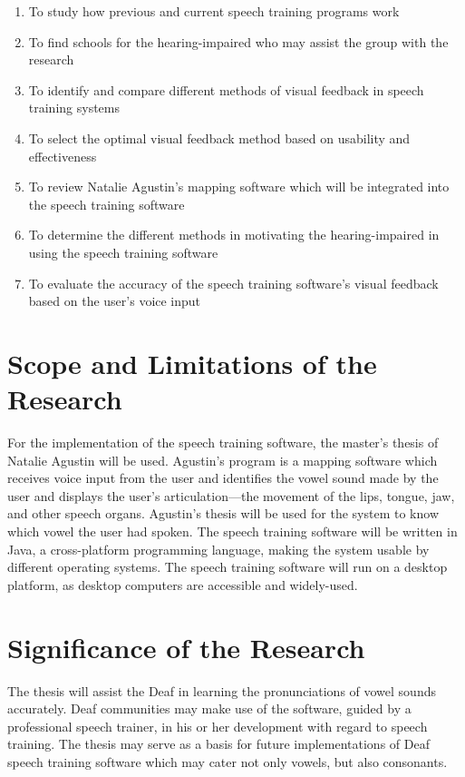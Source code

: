 \begin{enumerate}
\item To study how previous and current speech training programs work
\item To find schools for the hearing-impaired who may assist the group with the research
\item To identify and compare different methods of visual feedback in speech training systems
\item To select the optimal visual feedback method based on usability and effectiveness
\item To review Natalie Agustin's \citeyear{agustin:2014:SOM} mapping software which will be integrated into the speech training software
\item To determine the different methods in motivating the hearing-impaired in using the speech training software
\item To evaluate the accuracy of the speech training software's visual feedback based on the user's voice input
\end{enumerate}

\section{Scope and Limitations of the Research}
\label{sec:scopelimitations}

For the implementation of the speech training software, the master's thesis of Natalie Agustin \citeyear{agustin:2014:SOM} will be used. Agustin's program is a mapping software which receives voice input from the user and identifies the vowel sound made by the user and displays the user’s articulation—the movement of the lips, tongue, jaw, and other speech organs. Agustin's thesis will be used for the system to know which vowel the user had spoken.
The speech training software will be written in Java, a cross-platform programming language, making the system usable by different operating systems.
The speech training software will run on a desktop platform, as desktop computers are accessible and widely-used.

\section{Significance of the Research}
\label{sec:significance}

The thesis will assist the Deaf in learning the pronunciations of vowel sounds accurately. Deaf communities may make use of the software, guided by a professional speech trainer, in his or her development with regard to speech training.
The thesis may serve as a basis for future implementations of Deaf speech training software which may cater not only vowels, but also consonants.